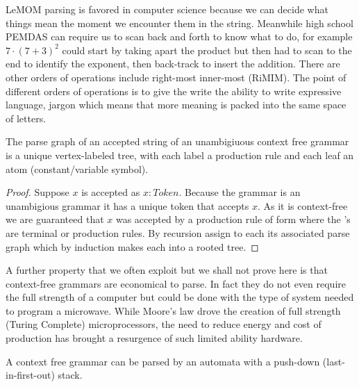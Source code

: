 LeMOM parsing is favored in computer science because we can 
decide what things mean the moment we encounter them in the string.
Meanwhile high school PEMDAS can require us to scan back and forth 
to know what to do, for example $7\cdot (7+3)^2$ could start by taking 
apart the product but then had to scan to the end to identify the exponent,
then back-track to insert the addition.  
There are other orders of operations include right-most inner-most (RiMIM).
The point of different orders of operations is to give the write the ability 
to write expressive language, jargon which means that more meaning is packed 
into the same space of letters.




\begin{proposition}
    The parse graph of an accepted string of an unambigiuous context free grammar 
    is a unique vertex-labeled tree, with each label a production rule and each leaf 
    an atom (constant/variable symbol).
\end{proposition}
\begin{proof}
    Suppose $x$ is accepted as $x:Token$.  
    Because the grammar is an unambigious grammar 
    it has a unique token that accepts $x$.
    As it is context-free we are guaranteed 
    that $x$ was accepted by a production rule of form 
     where the 
    's are 
    terminal or production rules.  By recursion assign 
    to each  its associated parse graph which
     by induction makes each into a rooted tree.
\end{proof}

A further property that we often exploit but we shall not prove here is that 
context-free grammars are economical to parse.  In fact they do not even 
require the full strength of a computer but could be done with the type 
of system needed to program a microwave.  While Moore's law drove the creation 
of full strength (Turing Complete) microprocessors, the need to reduce energy 
and cost of production has brought a resurgence of such limited ability 
hardware.  
\begin{proposition}
    A context free grammar can be parsed by an automata with a push-down (last-in-first-out)
    stack.
\end{proposition}

